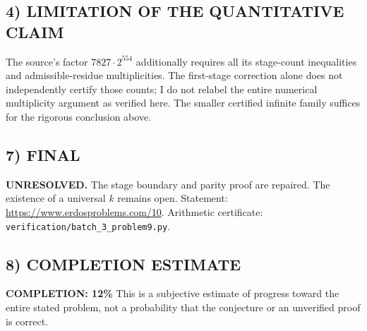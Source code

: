 \subsection*{4) LIMITATION OF THE QUANTITATIVE CLAIM}
The source's factor $7827\cdot2^{554}$ additionally requires all its stage-count inequalities and admissible-residue multiplicities. The first-stage correction alone does not independently certify those counts; I do not relabel the entire numerical multiplicity argument as verified here. The smaller certified infinite family suffices for the rigorous conclusion above.
\subsection*{7) FINAL}
\textbf{UNRESOLVED.} The stage boundary and parity proof are repaired. The existence of a universal $k$ remains open.
\noindent Statement: \url{https://www.erdosproblems.com/10}. Arithmetic certificate: \texttt{verification/batch\_3\_problem9.py}.

\subsection*{8) COMPLETION ESTIMATE}
\textbf{COMPLETION: 12\%}
This is a subjective estimate of progress toward the entire stated problem, not a probability that the conjecture or an unverified proof is correct.
